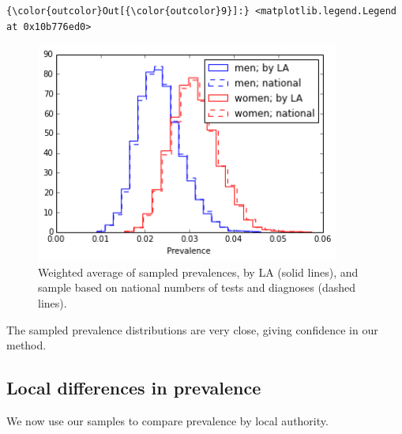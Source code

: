 \documentclass{article}
\begin{document}
    \begin{footnotesize}
            \begin{Verbatim}[commandchars=\\\{\}]
{\color{outcolor}Out[{\color{outcolor}9}]:} <matplotlib.legend.Legend at 0x10b776ed0>
\end{Verbatim}
    \end{footnotesize}
        
    \begin{figure}
        \begin{center}\includegraphics[width=10cm]{local_authorities_files/local_authorities_16_1.png}\end{center}
        \caption{Weighted average of sampled prevalences, by LA (solid lines), and sample based on national numbers of tests and diagnoses (dashed lines).}
        \label{}
    \end{figure}
    
    The sampled prevalence distributions are very close, giving confidence
in our method.

\subsection{Local differences in
prevalence}\label{local-differences-in-prevalence}

We now use our samples to compare prevalence by local authority.
\end{document}
